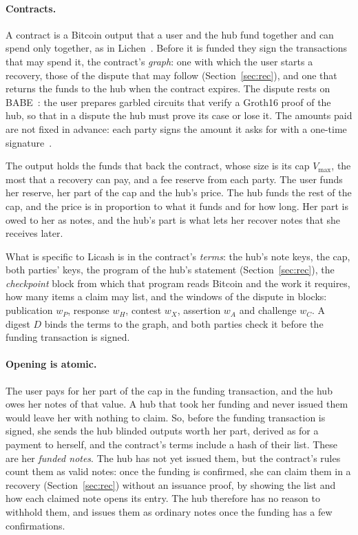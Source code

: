 \documentclass[11pt]{article}
\newcommand{\vmax}{V_{\max}}
\newcommand{\wH}{w_H}
\newcommand{\wP}{w_P}
\newcommand{\wA}{w_A}
\newcommand{\wC}{w_C}
\newcommand{\wX}{w_X}
\begin{document}
\paragraph{Contracts.} A contract is a Bitcoin output that a user and the hub fund together and can spend only together, as in Lichen~\cite{lichen}. Before it is funded they sign the transactions that may spend it, the contract's \emph{graph}: one with which the user starts a recovery, those of the dispute that may follow (Section~\ref{sec:rec}), and one that returns the funds to the hub when the contract expires. The dispute rests on BABE~\cite{babe}: the user prepares garbled circuits that verify a Groth16 proof of the hub, so that in a dispute the hub must prove its case or lose it. The amounts paid are not fixed in advance: each party signs the amount it asks for with a one-time signature~\cite{delving}.

The output holds the funds that back the contract, whose size is its cap $\vmax$, the most that a recovery can pay, and a fee reserve from each party. The user funds her reserve, her part of the cap and the hub's price. The hub funds the rest of the cap, and the price is in proportion to what it funds and for how long. Her part is owed to her as notes, and the hub's part is what lets her recover notes that she receives later.

What is specific to Licash is in the contract's \emph{terms}: the hub's note keys, the cap, both parties' keys, the program of the hub's statement (Section~\ref{sec:rec}), the \emph{checkpoint} block from which that program reads Bitcoin and the work it requires, how many items a claim may list, and the windows of the dispute in blocks: publication $\wP$, response $\wH$, contest $\wX$, assertion $\wA$ and challenge $\wC$. A digest $D$ binds the terms to the graph, and both parties check it before the funding transaction is signed.

\paragraph{Opening is atomic.} The user pays for her part of the cap in the funding transaction, and the hub owes her notes of that value. A hub that took her funding and never issued them would leave her with nothing to claim. So, before the funding transaction is signed, she sends the hub blinded outputs worth her part, derived as for a payment to herself, and the contract's terms include a hash of their list. These are her \emph{funded notes}. The hub has not yet issued them, but the contract's rules count them as valid notes: once the funding is confirmed, she can claim them in a recovery (Section~\ref{sec:rec}) without an issuance proof, by showing the list and how each claimed note opens its entry. The hub therefore has no reason to withhold them, and issues them as ordinary notes once the funding has a few confirmations.
\end{document}
